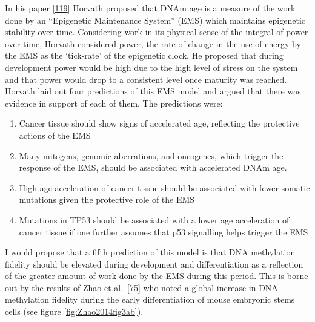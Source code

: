 \documentclass[
]{book}
\providecommand{\tightlist}{%
  \setlength{\itemsep}{0pt}\setlength{\parskip}{0pt}}
\begin{document}
In his paper {[}\protect\hyperlink{ref-Horvath2013}{119}{]} Horvath proposed that DNAm age is a measure of the work done by an ``Epigenetic Maintenance System'' (EMS) which maintains epigenetic stability over time.
Considering work in its physical sense of the integral of power over time, Horvath considered power, the rate of change in the use of energy by the EMS as the `tick-rate' of the epigenetic clock.
He proposed that during development power would be high due to the high level of stress on the system and that power would drop to a consistent level once maturity was reached.
Horvath laid out four predictions of this EMS model and argued that there was evidence in support of each of them. The predictions were:

\begin{enumerate}
\def\labelenumi{\arabic{enumi}.}
\tightlist
\item
  Cancer tissue should show signs of accelerated age, reflecting the protective actions of the EMS
\item
  Many mitogens, genomic aberrations, and oncogenes, which trigger the response of the EMS, should be associated with accelerated DNAm age.
\item
  High age acceleration of cancer tissue should be associated with fewer somatic mutations given the protective role of the EMS
\item
  Mutations in TP53 should be associated with a lower age acceleration of cancer tissue if one further assumes that p53 signalling helps trigger the EMS
\end{enumerate}

I would propose that a fifth prediction of this model is that DNA methylation fidelity should be elevated during development and differentiation as a reflection of the greater amount of work done by the EMS during this period.
This is borne out by the results of Zhao et al.~{[}\protect\hyperlink{ref-Zhao2014}{75}{]} who noted a global increase in DNA methylation fidelity during the early differentiation of mouse embryonic stems cells (see figure \ref{fig:Zhao2014fig3ab}).
\end{document}
